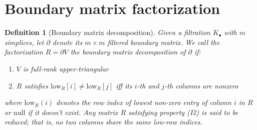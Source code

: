 \documentclass[10pt]{article}
\numberwithin{equation}{section}
\newcommand{\+}{%
	\raisebox{0.18ex}{\scaleobj{0.55}{+}}
}
\newtheorem{definition}{Definition}
\theoremstyle{definition}
\begin{document}






\appendix

\section{Boundary matrix factorization}
\begin{definition}[Boundary matrix decomposition]
Given a filtration $K_\bullet$ with $m$ simplices, let $\partial$ denote its $m \times m$ filtered boundary matrix. We call the factorization $R = \partial V$ the \emph{boundary matrix decomposition} of $\partial$ if:
 \begin{enumerate}[labelsep=3pt, topsep=3pt, itemsep=-0.10ex,parsep=1.2ex]
 	\item[I1.] $V$ is full-rank upper-triangular
 	\item[I2.] $R$ satisfies $\mathrm{low}_R[i] \neq \mathrm{low}_R[j]$ iff its $i$-th and $j$-th columns are nonzero
 	\end{enumerate} 
 	where $\mathrm{low}_R(i)$ denotes the row index of lowest non-zero entry of column $i$ in $R$ or $\mathrm{null}$ if it doesn't exist. Any matrix $R$ satisfying property (I2) is said to be  \emph{reduced}; that is, no two columns share the same low-row indices.
\end{definition}
\end{document}
